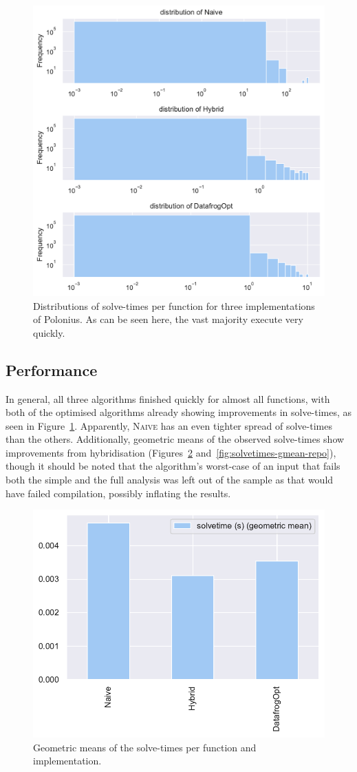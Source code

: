 \documentclass[11pt,a4paper,twoside,openany]{report}
\begin{document}
\begin{figure}
  \includegraphics[width=0.9\linewidth]{Graphs/solvetimes_dist.pdf}
  \caption{Distributions of solve-times per function for three implementations
    of Polonius. As can be seen here, the vast majority execute very quickly.}
  \label{fig:solvetimes}
\end{figure}

\subsection{Performance}\label{sec:inputs:performance}

In general, all three algorithms finished quickly for almost all functions, with
both of the optimised algorithms already showing improvements in
solve-times, as seen in Figure~\ref{fig:solvetimes}. Apparently, \textsc{Naive}
has an even tighter spread of solve-times than the others. Additionally,
geometric means of the observed solve-times show improvements from hybridisation
(Figures~\ref{fig:solvetimes-gmean-fn} and~\ref{fig:solvetimes-gmean-repo}),
though it should be noted that the algorithm's worst-case of an input that fails
both the simple and the full analysis was left out of the sample as that would
have failed compilation, possibly inflating the results.

\begin{figure}
  \includegraphics[width=0.5\linewidth]{Graphs/solvetimes_fn_gmean.pdf}
  \caption{Geometric means of the solve-times per function and implementation.}
  \label{fig:solvetimes-gmean-fn}
\end{figure}
\end{document}
